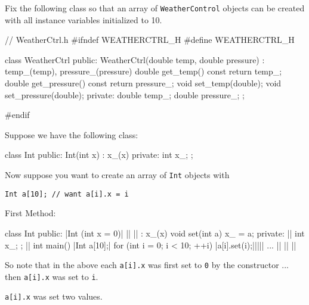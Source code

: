 \begin{ex}
Fix the following class so that an array of
\texttt{WeatherControl} objects can be created with all instance variables
initialized to 10.
\begin{console}
// WeatherCtrl.h
#ifndef WEATHERCTRL_H
#define WEATHERCTRL_H

class WeatherCtrl
{
public:
        WeatherCtrl(double temp, double pressure)
        : temp_(temp), pressure_(pressure)
        {}
        double get_temp() const { return temp_; }
        double get_pressure() const { return pressure_; }
        void set_temp(double);
        void set_pressure(double);
private:
        double temp_;
        double pressure_;
};

#endif
\end{console}
\end{ex}
Suppose we have the following class:

\begin{console}
class Int
{
public:
        Int(int x)
        : x_(x)
        {}
private:
        int x_;
};
\end{console}
Now suppose you want to create an array of \texttt{Int} objects with
\begin{center}
\texttt{Int a[10]; // want a[i].x = i}
\end{center}
First Method:
\begin{consolethree}[escapeinside=||]
class Int
{                      
public:
    |Int (int x = 0)| || ||  
        : x_(x) {}
    void set(int a)    
    {
        x_ = a;        
    }                  
private:                 ||  
    int x_;
};
||
int main()
{               
    |Int a[10];|
    for (int i = 0; i < 10; ++i)
        |a[i].set(i);|||||
    ... || || ||
}
\end{consolethree}
\newpage So note that in the above each \texttt{a[i].x} was first set to \texttt{0} by the constructor ... then \texttt{a[i].x} was set to \texttt{i}.

 \texttt{a[i].x} was set two values.

